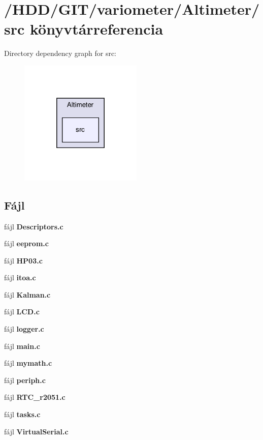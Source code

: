 \section{/\-H\-D\-D/\-G\-I\-T/variometer/\-Altimeter/src könyvtárreferencia}
\label{dir_bcad66b76c283ffdfc1315a968233a3f}
Directory dependency graph for src\-:
\nopagebreak
\begin{figure}[H]
\begin{center}
\leavevmode
\includegraphics[width=166pt]{dir_bcad66b76c283ffdfc1315a968233a3f_dep}
\end{center}
\end{figure}
\subsection*{Fájl}
\begin{DoxyCompactItemize}
\item 
fájl {\bf Descriptors.\-c}
\item 
fájl {\bf eeprom.\-c}
\item 
fájl {\bf H\-P03.\-c}
\item 
fájl {\bf itoa.\-c}
\item 
fájl {\bf Kalman.\-c}
\item 
fájl {\bf L\-C\-D.\-c}
\item 
fájl {\bf logger.\-c}
\item 
fájl {\bf main.\-c}
\item 
fájl {\bf mymath.\-c}
\item 
fájl {\bf periph.\-c}
\item 
fájl {\bf R\-T\-C\-\_\-r2051.\-c}
\item 
fájl {\bf tasks.\-c}
\item 
fájl {\bf Virtual\-Serial.\-c}
\end{DoxyCompactItemize}
